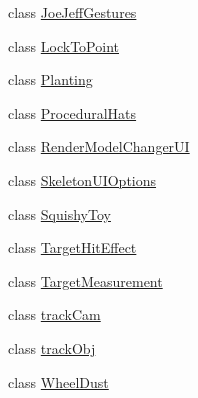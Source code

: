 \begin{DoxyCompactItemize}
\item 
class \mbox{\hyperlink{class_valve_1_1_v_r_1_1_interaction_system_1_1_sample_1_1_joe_jeff_gestures}{Joe\+Jeff\+Gestures}}
\item 
class \mbox{\hyperlink{class_valve_1_1_v_r_1_1_interaction_system_1_1_sample_1_1_lock_to_point}{Lock\+To\+Point}}
\item 
class \mbox{\hyperlink{class_valve_1_1_v_r_1_1_interaction_system_1_1_sample_1_1_planting}{Planting}}
\item 
class \mbox{\hyperlink{class_valve_1_1_v_r_1_1_interaction_system_1_1_sample_1_1_procedural_hats}{Procedural\+Hats}}
\item 
class \mbox{\hyperlink{class_valve_1_1_v_r_1_1_interaction_system_1_1_sample_1_1_render_model_changer_u_i}{Render\+Model\+Changer\+UI}}
\item 
class \mbox{\hyperlink{class_valve_1_1_v_r_1_1_interaction_system_1_1_sample_1_1_skeleton_u_i_options}{Skeleton\+U\+I\+Options}}
\item 
class \mbox{\hyperlink{class_valve_1_1_v_r_1_1_interaction_system_1_1_sample_1_1_squishy_toy}{Squishy\+Toy}}
\item 
class \mbox{\hyperlink{class_valve_1_1_v_r_1_1_interaction_system_1_1_sample_1_1_target_hit_effect}{Target\+Hit\+Effect}}
\item 
class \mbox{\hyperlink{class_valve_1_1_v_r_1_1_interaction_system_1_1_sample_1_1_target_measurement}{Target\+Measurement}}
\item 
class \mbox{\hyperlink{class_valve_1_1_v_r_1_1_interaction_system_1_1_sample_1_1track_cam}{track\+Cam}}
\item 
class \mbox{\hyperlink{class_valve_1_1_v_r_1_1_interaction_system_1_1_sample_1_1track_obj}{track\+Obj}}
\item 
class \mbox{\hyperlink{class_valve_1_1_v_r_1_1_interaction_system_1_1_sample_1_1_wheel_dust}{Wheel\+Dust}}
\end{DoxyCompactItemize}
